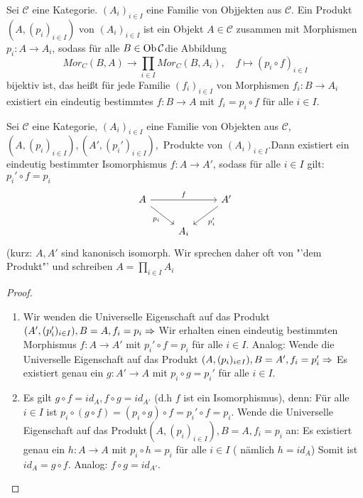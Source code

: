 \begin{df}
	Sei $\mathcal{C}$ eine Kategorie. $(A_i)_{i \in I} $ eine Familie von Objjekten aus $\mathcal{C}$. Ein Produkt $(A, (p_i)_{i \in I})$ von $(A_i)_{i \in I}$ ist ein Objekt $A\in \mathcal{C} $ zusammen mit Morphismen $p_i:A \to A_i $, sodass für alle $B \in \text{Ob}\,\mathcal{C} $die Abbildung $$ Mor_C(B,A) \to \prod_{i \in I} Mor_C(B,A_i) , \quad f \mapsto (p_i \circ f) _{i \in I} $$ bijektiv ist, das heißt für jede Familie $(f_i)_{i \in I}$ von Morphismen $f_i: B \to A_i $ existiert ein eindeutig bestimmtes $f:B \to A $ mit $ f_i = p_i \circ f $ für alle $ i \in I$.
\end{df}
\begin{bem}
	Sei $\mathcal{C}$ eine Kategorie, $(A_i)_{i \in I}$ eine Familie von Objekten aus $\mathcal{C}$, $(A, (p_i)_{i \in I}), (A', (p_i')_{i \in I}),$ Produkte von $(A_i)_{i \in I}. $Dann existiert ein eindeutig bestimmter Isomorphismus $ f:A \to A' $, sodass für alle $i \in I $ gilt: $p_i' \circ f = p_i$
	$$\begin{tikzcd}
	A \arrow{rr}{f} \arrow[swap]{dr}{p_i} & & A' \arrow{dl}{p_i'	}\\
	&A_i& 
	\end{tikzcd}$$
	(kurz: $A,A'$ sind kanonisch isomorph. Wir sprechen daher oft von "'dem Produkt"' und schreiben $ A = \prod_{i \in I} A_i $
\end{bem}
\begin{proof}
	\begin{enumerate} 
		\item Wir wenden die Universelle Eigenschaft auf das Produkt $(A', (p_i')_{i \in I}), B = A, f_i = p_i \Rightarrow $ Wir erhalten einen eindeutig bestimmten Morphismus $ f: A \to A' $ mit $ p_i' \circ f = p_i $ für alle $ i \in I$. Analog: Wende die Universelle Eigenschaft auf das Produkt $(A, (p_i)_{i \in I}), B = A', f_i= p_i' \Rightarrow $ Es existiert genau ein $ g: A' \to A $ mit $p_i \circ g = p_i'$ für alle $i \in I $.
		\item Es gilt $ g \circ f = id_A, f \circ g = id_{A'} $ (d.h $f$ ist ein Isomorphismus), denn: Für alle $ i \in I $ ist $p_i \circ ( g \circ f ) = ( p_i \circ g) \circ f =  p_i' \circ f = p_i $. Wende die Universelle Eigenschaft auf das Produkt$ (A, (p_i)_{i \in I}), B= A, f_i = p_i $ an:
		Es existiert genau ein $ h: A \to A $ mit $ p_i \circ h = p_i $ für alle $ i \in I $ ( nämlich $ h = id_A $) Somit ist $ id_A = g \circ f.$ Analog:  $ f \circ g = id_{A'}$.
	\end{enumerate}
\end{proof}
